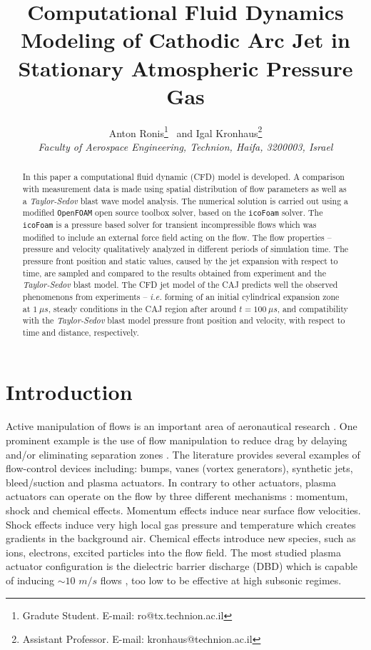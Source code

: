 \documentclass[a4paper]{iacas}%
\title{Computational Fluid Dynamics Modeling of Cathodic Arc Jet in Stationary Atmospheric Pressure Gas}
\author{%
	Anton Ronis\thanks{Gradute Student. E-mail: ro@tx.technion.ac.il}
	\ and
	Igal Kronhaus\thanks{Assistant Professor. E-mail: kronhaus@technion.ac.il}\\
	{\normalsize\itshape
		Faculty of Aerospace Engineering, Technion, Haifa,
		3200003, Israel}
}
\begin{document}
	
	\maketitle
	
	\begin{abstract}
		In this paper a computational fluid dynamic (CFD) model is developed. A comparison with measurement data is made using spatial distribution of flow parameters as well as a \emph{Taylor-Sedov} blast wave model analysis.
		The numerical solution is carried out using a modified \texttt{OpenFOAM} open source toolbox solver, based on the \texttt{icoFoam} solver. The \texttt{icoFoam} is a pressure based solver for transient incompressible flows which was modified to include an external force field acting on the flow.
		The flow properties -- pressure and velocity qualitatively analyzed in different periods of simulation time. The pressure front position and static values, caused by the jet expansion with respect to time, are sampled and compared to the results obtained from experiment and the \emph{Taylor-Sedov} blast model.
		The CFD jet model of the CAJ predicts well the observed phenomenons from experiments -- \emph{i.e.} forming of an initial cylindrical expansion zone at $1~\mu s$, steady conditions in the CAJ region after around $t = 100~\mu s$, and compatibility with the \emph{Taylor-Sedov} blast model pressure front position and velocity, with respect to time and distance, respectively. 
	\end{abstract}

\section{Introduction}
Active manipulation of flows is an important area of aeronautical research \cite{GADEL}. One prominent example is the use of flow manipulation to reduce drag by delaying and/or eliminating separation zones \cite{SIMPSON}. The literature provides several examples of flow-control devices including: bumps, vanes (vortex generators), synthetic jets, bleed/suction and plasma actuators.
In contrary to other actuators, plasma actuators can operate on the flow by three different mechanisms \cite{FLOWCTRL}: momentum, shock and chemical effects. Momentum effects induce near surface flow velocities. Shock effects induce very high local gas pressure and temperature which creates gradients in the background air. Chemical effects introduce new species, such as ions, electrons, excited particles into the flow field. The most studied plasma actuator configuration is the dielectric barrier discharge (DBD) which is capable of inducing $\sim10$ $m/s$ flows \cite{FLOWCTRL,KOK,WHALLEY,MOREAU}, too low to be effective at high subsonic regimes.
\end{document}
